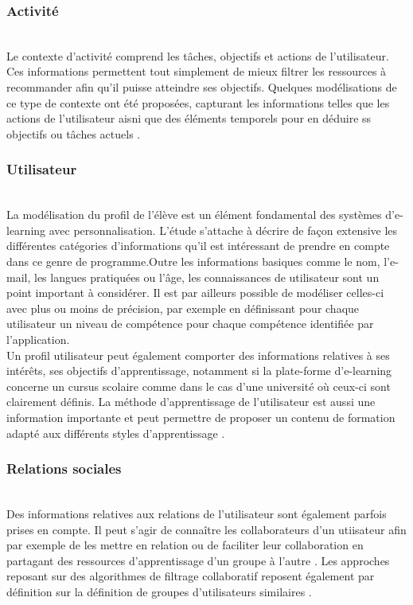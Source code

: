 \documentclass[conference]{./sty/IEEEtran}
\begin{document}
\subsubsection{Activité}
~\\
Le contexte d'activité comprend les tâches, objectifs et actions de l'utilisateur. Ces informations permettent tout simplement de mieux filtrer les ressources à recommander afin qu'il puisse atteindre ses objectifs. Quelques modélisations de ce type de contexte ont été proposées, capturant les informations telles que les actions de l'utilisateur aisni que des éléments temporels pour en déduire ss objectifs ou tâches actuels \cite{DBLP:journals/tlt/VerbertMOWDBD12}.\\


\subsubsection{Utilisateur}
~\\
La modélisation du profil de l'élève est un élément fondamental des systèmes
d'e-learning avec personnalisation. L'étude
\cite{DBLP:journals/tlt/VerbertMOWDBD12} s'attache à décrire de façon extensive
les différentes catégories d'informations qu'il est intéressant de prendre en
compte dans ce genre de programme.Outre les informations basiques comme le nom,
l'e-mail, les langues pratiquées ou l'âge, les connaissances de utilisateur sont
un point important à considérer. Il est par ailleurs possible de modéliser
celles-ci avec plus ou moins de précision, par exemple en définissant pour
chaque utilisateur un niveau de compétence pour chaque compétence identifiée
par l'application\cite{DBLP:journals/jucs/SternKHKL10}. \\

Un profil utilisateur peut également comporter des informations relatives à ses
intérêts, ses objectifs d'apprentissage, notamment si la plate-forme
d'e-learning concerne un cursus scolaire comme dans le cas d'une université où
ceux-ci sont clairement définis. La méthode d'apprentissage de l'utilisateur
est aussi une information importante et peut permettre de proposer un contenu
de formation adapté aux différents styles d'apprentissage
\cite{smartECourseRecommander}. \\

\subsubsection{Relations sociales}
~\\
Des informations relatives aux relations de l'utilisateur sont également parfois prises en compte. Il peut s'agir de connaître les collaborateurs d'un utiisateur afin par exemple de les mettre en relation\cite{DBLP:journals/procedia/BehamKLL10} ou de faciliter leur collaboration en partagant des ressources d'apprentissage d'un groupe à l'autre \cite{DBLP:conf/wstst/Kurti08}. Les approches reposant sur des algorithmes de filtrage collaboratif reposent également par définition sur la définition de groupes d'utilisateurs similaires \cite{Liou:2014:CPL:2617848.2617854}.
\end{document}
